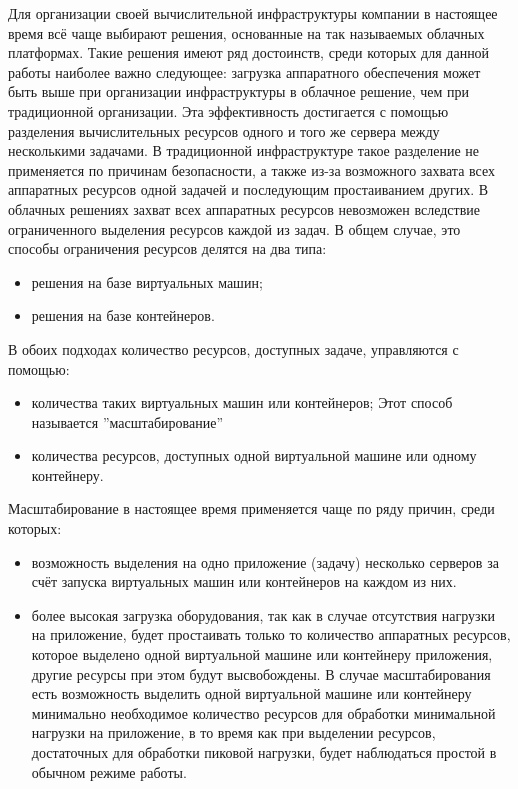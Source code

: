 
Для организации своей вычислительной инфраструктуры компании в настоящее время всё чаще выбирают решения, основанные на так называемых облачных платформах.
Такие решения имеют ряд достоинств, среди которых для данной работы наиболее важно следующее: загрузка аппаратного обеспечения может быть выше при организации инфраструктуры в облачное решение, чем при традиционной организации\cite{cloud-computing-concepts}.
Эта эффективность достигается с помощью разделения вычислительных ресурсов одного и того же сервера между несколькими задачами.
В традиционной инфраструктуре такое разделение не применяется по причинам безопасности, а также из-за возможного захвата всех аппаратных ресурсов одной задачей и последующим простаиванием других.
В облачных решениях захват всех аппаратных ресурсов невозможен вследствие ограниченного выделения ресурсов каждой из задач.
В общем случае, это способы ограничения ресурсов делятся на два типа\cite{containers-and-vm-big-data}:
\begin{itemize}
    \item решения на базе виртуальных машин;
    \item решения на базе контейнеров.
\end{itemize}

В обоих подходах количество ресурсов, доступных задаче, управляются с помощью:
\begin{itemize}
    \item количества таких виртуальных машин или контейнеров;
    Этот способ называется ''масштабирование''
    \item количества ресурсов, доступных одной виртуальной машине или одному контейнеру.
\end{itemize}
Масштабирование в настоящее время применяется чаще по ряду причин, среди которых:
\begin{itemize}
    \item возможность выделения на одно приложение (задачу) несколько серверов за счёт запуска виртуальных машин или контейнеров на каждом из них.
    \item более высокая загрузка оборудования, так как в случае отсутствия нагрузки на приложение, будет простаивать только то количество аппаратных ресурсов, которое выделено одной виртуальной машине или контейнеру приложения, другие ресурсы при этом будут высвобождены.
    В случае масштабирования есть возможность выделить одной виртуальной машине или контейнеру минимально необходимое количество ресурсов для обработки минимальной нагрузки на приложение, в то время как при выделении ресурсов, достаточных для обработки пиковой нагрузки, будет наблюдаться простой в обычном режиме работы. 
\end{itemize}

